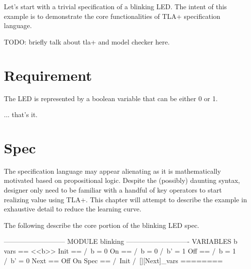 \documentclass{report}
\begin{document}
Let's start with a trivial specification of a blinking LED. The intent of this example 
is to demonstrate the core functionalities of TLA+ specification language.

TODO: briefly talk about tla+ and model checker here.

\section{Requirement}

The LED is represented by a boolean variable that can be either 0 or 1.\newline

... that's it.

\section{Spec}

The specification language may appear alienating as it is mathematically
motivated based on propositional logic. Despite the (possibly) daunting syntax,
designer only need to be familiar with a handful of key operators to start
realizing value using TLA+. This chapter will attempt to describe the example in
exhaustive detail to reduce the learning curve.

The following describe the core portion of the blinking LED spec. 

\begin{tla}
--------------------------- MODULE blinking ----------------------------
VARIABLES b 
vars == <<b>>
Init ==
    /\ b = 0
On == 
    /\ b = 0
    /\ b' = 1
Off == 
    /\ b = 1
    /\ b' = 0
Next ==
    \/ Off 
    \/ On
Spec ==
    /\ Init
    /\ [][Next]_vars
========
\end{tla}
\begin{tlatex}
\@x{}\moduleLeftDash{}\moduleRightDash\@xx{}%
%
%
%
%
%
%
%
%
%
%
%
%
%
%
%
%
\@x{}\bottombar\@xx{}%
\end{tlatex}
\end{document}

